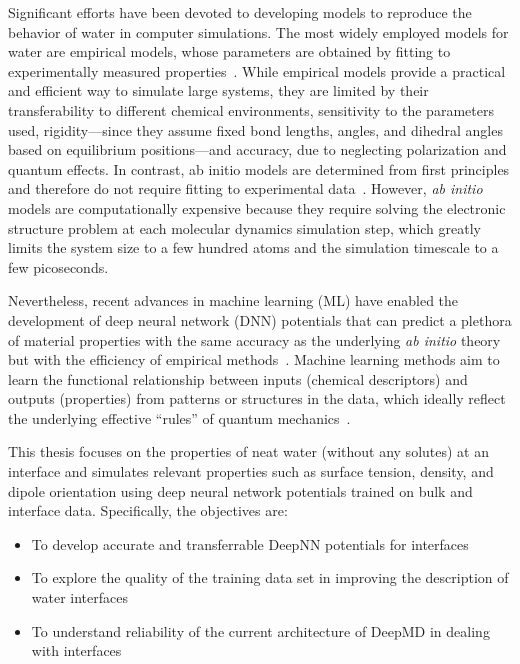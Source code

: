 Significant efforts have been devoted to developing models to reproduce the behavior of water in computer simulations. The most widely employed models for water are empirical models, whose parameters are obtained by fitting to experimentally measured properties~\cite{Duin2001,brenner2002second,daw1984embedded}. While empirical models provide a practical and efficient way to simulate large systems, they are limited by their transferability to different chemical environments, sensitivity to the parameters used, rigidity—since they assume fixed bond lengths, angles, and dihedral angles based on equilibrium positions—and accuracy, due to neglecting polarization and quantum effects.  In contrast, ab initio models are determined from first principles and therefore do not require fitting to experimental data~\cite{car1985unified,Marx2009,kohn1965self}. However, \emph{ab initio} models are computationally expensive because they require solving the electronic structure problem at each molecular dynamics simulation step, which greatly limits the system size to a few hundred atoms and the simulation timescale to a few picoseconds.

Nevertheless, recent advances in machine learning (ML) have enabled the development of deep neural network (DNN) potentials that can predict a plethora of material properties with the same accuracy as the underlying \emph{ab initio} theory but with the efficiency of empirical methods~\cite{Thompson2015,Huan2017,Behler2007,Behler2016,Chmiela2017,Unke2021}. Machine learning methods aim to learn the functional relationship between inputs (chemical descriptors) and outputs (properties) from patterns or structures in the data, which ideally reflect the underlying effective “rules” of quantum mechanics~\cite{schutt2020machine}.

This thesis focuses on the properties of neat water (without any solutes) at an interface and simulates relevant properties such as surface tension, density, and dipole orientation using deep neural network potentials trained on bulk and interface data. Specifically, the objectives are:

\begin{itemize}
      \item To develop accurate and transferrable DeepNN potentials for
            interfaces
      \item To explore the quality of the training data set in improving the
            description of water interfaces
      \item To understand reliability of the current architecture of DeepMD in
            dealing with interfaces
\end{itemize}

